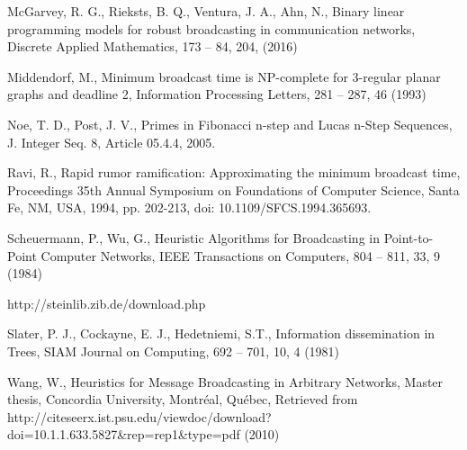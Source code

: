 \documentclass[preprint,12pt, review]{elsarticle}
\begin{document}
\begin{thebibliography}{}
McGarvey, R. G., Rieksts, B. Q., Ventura, J. A., Ahn, N.,
Binary linear programming models for robust broadcasting in communication networks,
Discrete Applied Mathematics, 173 -- 84, 204, (2016)

Middendorf, M.,
Minimum broadcast time is NP-complete for 3-regular planar graphs and deadline 2,
Information Processing Letters, 281 -- 287, 46 (1993)

Noe, T. D., Post, J. V., 
Primes in Fibonacci n-step and Lucas n-Step Sequences,
J. Integer Seq. 8, Article 05.4.4, 2005.

Ravi, R.,
Rapid rumor ramification: Approximating the minimum broadcast time,
Proceedings 35th Annual Symposium on Foundations of Computer Science, Santa Fe, NM, USA, 1994, pp. 202-213, doi: 10.1109/SFCS.1994.365693.

Scheuermann, P., Wu, G.,
Heuristic Algorithms for Broadcasting in Point-to-Point Computer Networks,
IEEE Transactions on Computers, 804 -- 811, 33, 9 (1984)

http://steinlib.zib.de/download.php

Slater, P. J., Cockayne, E. J., Hedetniemi, S.T.,
Information dissemination in Trees,
SIAM Journal on Computing, 692 -- 701, 10, 4 (1981)

Wang, W.,
Heuristics for Message Broadcasting in Arbitrary Networks,
Master thesis, Concordia University, Montr\'eal, Qu\'ebec, 
Retrieved from http://citeseerx.ist.psu.edu/viewdoc/download?doi=10.1.1.633.5827\&rep=rep1\&type=pdf (2010)



\end{thebibliography}
\end{document}
